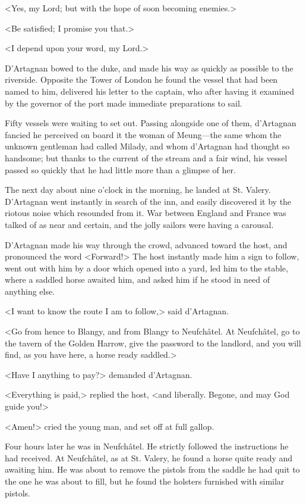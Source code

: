 <Yes, my Lord; but with the hope of soon becoming enemies.> 

<Be satisfied; I promise you that.> 

<I depend upon your word, my Lord.> 

D'Artagnan bowed to the duke, and made his way as quickly as possible to the riverside. Opposite the Tower of London he found the vessel that had been named to him, delivered his letter to the captain, who after having it examined by the governor of the port made immediate preparations to sail. 

Fifty vessels were waiting to set out. Passing alongside one of them, d'Artagnan fancied he perceived on board it the woman of Meung---the same whom the unknown gentleman had called Milady, and whom d'Artagnan had thought so handsome; but thanks to the current of the stream and a fair wind, his vessel passed so quickly that he had little more than a glimpse of her. 

The next day about nine o'clock in the morning, he landed at St. Valery. D'Artagnan went instantly in search of the inn, and easily discovered it by the riotous noise which resounded from it. War between England and France was talked of as near and certain, and the jolly sailors were having a carousal. 

D'Artagnan made his way through the crowd, advanced toward the host, and pronounced the word <Forward!> The host instantly made him a sign to follow, went out with him by a door which opened into a yard, led him to the stable, where a saddled horse awaited him, and asked him if he stood in need of anything else. 

<I want to know the route I am to follow,> said d'Artagnan. 

<Go from hence to Blangy, and from Blangy to Neufchâtel. At Neufchâtel, go to the tavern of the Golden Harrow, give the password to the landlord, and you will find, as you have here, a horse ready saddled.> 

<Have I anything to pay?> demanded d'Artagnan. 

<Everything is paid,> replied the host, <and liberally. Begone, and may God guide you!> 

<Amen!> cried the young man, and set off at full gallop. 

Four hours later he was in Neufchâtel. He strictly followed the instructions he had received. At Neufchâtel, as at St. Valery, he found a horse quite ready and awaiting him. He was about to remove the pistols from the saddle he had quit to the one he was about to fill, but he found the holsters furnished with similar pistols. 

